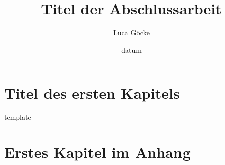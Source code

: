 \documentclass[pstricks,siunitx,theorem,british]{tumphthesis}
\title{Titel der Abschlussarbeit}
\author{Luca Göcke}
\date{datum}
\begin{document}

\frontmatter
\maketitle
\tableofcontents


\mainmatter
\chapter{Titel des ersten Kapitels}

template


\appendix
\chapter{Erstes Kapitel im Anhang}

\backmatter
\printbibliography
\end{document}
